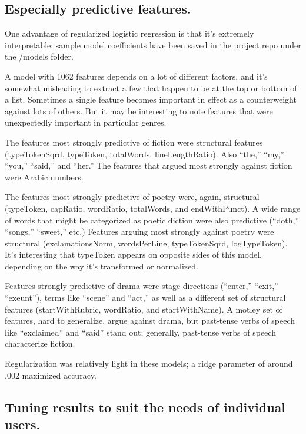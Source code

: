 \documentclass[paper=a4, fontsize=12pt]{scrartcl}
\numberwithin{equation}{section}		%
\numberwithin{figure}{section}			%
\numberwithin{table}{section}				%
\begin{document}
\subsection{Especially predictive features.}

One advantage of regularized logistic regression is that it's extremely interpretable; sample model coefficients have been saved in the project repo under the /models folder.

A model with 1062 features depends on a lot of different factors, and it's somewhat misleading to extract a few that happen to be at the top or bottom of a list. Sometimes a single feature becomes important in effect as a counterweight against lots of others. But it may be interesting to note features that were unexpectedly important in particular genres.

The features most strongly predictive of fiction were structural features (typeTokenSqrd, typeToken, totalWords, lineLengthRatio). Also ``the,'' ``my,'' ``you,'' ``said,'' and ``her.'' The features that argued most strongly against fiction were Arabic numbers.

The features most strongly predictive of poetry were, again, structural (typeToken, capRatio, wordRatio, totalWords, and endWithPunct). A wide range of words that might be categorized as poetic diction were also predictive (``doth,'' ``songs,'' ``sweet,'' etc.) Features arguing most strongly against poetry were structural (exclamationsNorm, wordsPerLine, typeTokenSqrd, logTypeToken). It's interesting that typeToken appears on opposite sides of this model, depending on the way it's transformed or normalized.

Features strongly predictive of drama were stage directions (``enter,'' ``exit,'' ``exeunt''), terms like ``scene'' and ``act,'' as well as a different set of structural features (startWithRubric, wordRatio, and startWithName). A motley set of features, hard to generalize, argue against drama, but past-tense verbs of speech like ``exclaimed'' and ``said'' stand out; generally, past-tense verbs of speech characterize fiction.

Regularization was relatively light in these models; a ridge parameter of around .002 maximized accuracy.

\subsection{Tuning results to suit the needs of individual users.}
\label{sec:eval}
\end{document}
